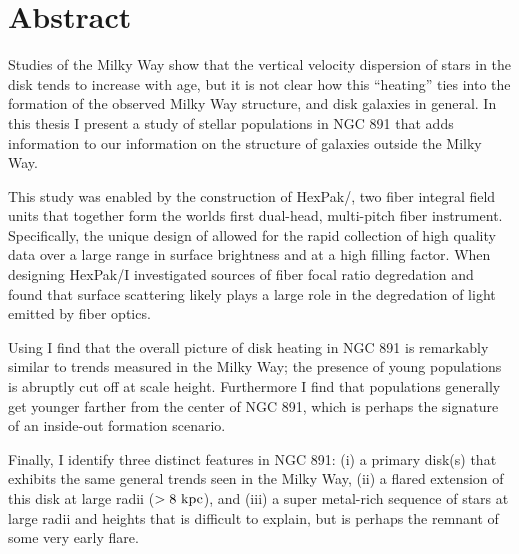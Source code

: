 \chapter*{Abstract}

Studies of the Milky Way show that the vertical velocity dispersion of
stars in the disk tends to increase with age, but it is not clear how
this ``heating'' ties into the formation of the observed Milky Way
structure, and disk galaxies in general. In this thesis I present a
study of stellar populations in NGC 891 that adds information to our
information on the structure of galaxies outside the Milky Way. 

This study was enabled by the construction of HexPak/\GP, two fiber
integral field units that together form the worlds first dual-head,
multi-pitch fiber instrument. Specifically, the unique design of \GP
allowed for the rapid collection of high quality data over a large
range in surface brightness and at a high filling factor. When
designing HexPak/\GP I investigated sources of fiber focal ratio
degredation and found that surface scattering likely plays a large
role in the degredation of light emitted by fiber optics.

Using \GP I find that the overall picture of disk heating in NGC 891
is remarkably similar to trends measured in the Milky Way; the
presence of young populations is abruptly cut off at  scale
height. Furthermore I find that populations generally get younger
farther from the center of NGC 891, which is perhaps the signature of
an inside-out formation scenario.

Finally, I identify three distinct features in NGC 891: (i) a primary
disk(s) that exhibits the same general trends seen in the Milky Way,
(ii) a flared extension of this disk at large radii ($>
8~\mathrm{kpc} $), and (iii) a super metal-rich sequence of stars at
large radii and heights that is difficult to explain, but is perhaps
the remnant of some very early flare.
